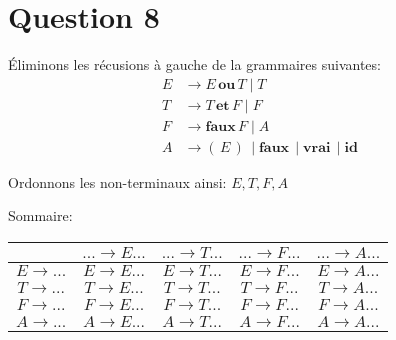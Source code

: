 \documentclass[class=article]{standalone}
\begin{document}
\section*{Question 8}

Éliminons les récusions à gauche de la grammaires suivantes:
\begin{align*}
    E &\rightarrow E \, \textbf{ou} \, T \mid T\\
    T &\rightarrow T \, \textbf{et} \, F \mid F\\
    F &\rightarrow \textbf{faux} \, F \mid A\\
    A &\rightarrow ( \, E \, ) \, \mid \textbf{faux} \, \mid \textbf{vrai} \, \mid \textbf{id}
\end{align*}

Ordonnons les non-terminaux ainsi:
$E, T, F, A$ 

Sommaire:
\begin{center}
    \begin{tabular}{c|c|c|c|c|}
        \cellcolor[HTML]{FFFFFF}                     & 
        \cellcolor[HTML]{FFFFFF} $... \rightarrow E...$ &
        \cellcolor[HTML]{FFFFFF} $... \rightarrow T...$ & 
        \cellcolor[HTML]{FFFFFF} $... \rightarrow F...$ & 
        \cellcolor[HTML]{FFFFFF} $... \rightarrow A...$ \\
    \hline
        \cellcolor[HTML]{FFFFFF} $E \rightarrow ...$ & 
        \cellcolor[HTML]{FFFFFF} $E \rightarrow E...$ & 
        \cellcolor[HTML]{ABFF00} $E \rightarrow T...$ & 
        \cellcolor[HTML]{ABFF00} $E \rightarrow F...$ & 
        \cellcolor[HTML]{ABFF00} $E \rightarrow A...$ \\
    \hline
        \cellcolor[HTML]{FFFFFF} $T \rightarrow ...$ & 
        \cellcolor[HTML]{FFFFFF} $T \rightarrow E...$ & 
        \cellcolor[HTML]{FFFFFF} $T \rightarrow T...$ & 
        \cellcolor[HTML]{ABFF00} $T \rightarrow F...$ &
        \cellcolor[HTML]{ABFF00} $T \rightarrow A...$ \\
    \hline
        \cellcolor[HTML]{FFFFFF} $F \rightarrow ...$ &
        \cellcolor[HTML]{FFFFFF} $F \rightarrow E...$ &
        \cellcolor[HTML]{FFFFFF} $F \rightarrow T...$ & 
        \cellcolor[HTML]{FFFFFF} $F \rightarrow F...$ & 
        \cellcolor[HTML]{ABFF00} $F \rightarrow A...$ \\
    \hline
        \cellcolor[HTML]{FFFFFF} $A \rightarrow ...$ & 
        \cellcolor[HTML]{FFFFFF} $A \rightarrow E...$ & 
        \cellcolor[HTML]{FFFFFF} $A \rightarrow T...$ & 
        \cellcolor[HTML]{FFFFFF} $A \rightarrow F...$ & 
        \cellcolor[HTML]{FFFFFF} $A \rightarrow A...$ \\
    \hline
    \end{tabular}
\end{center}
\end{document}
